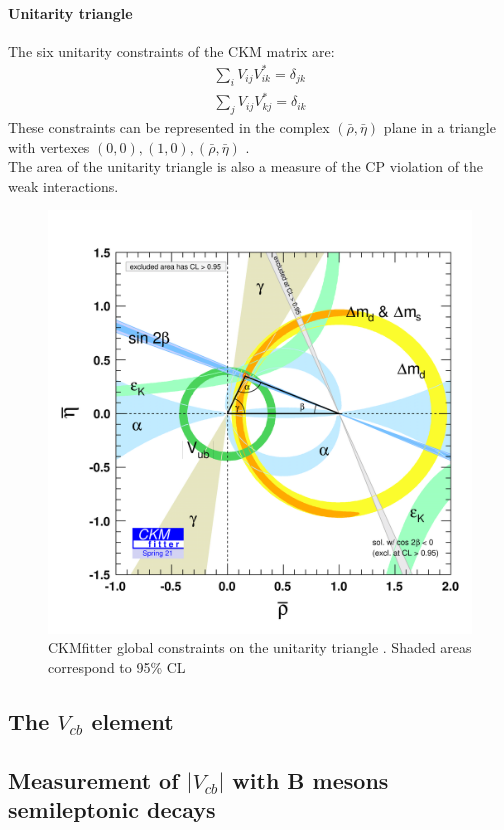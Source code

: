 \paragraph*{Unitarity triangle}
The six unitarity constraints of the CKM matrix are:
\begin{gather}
    \sum_i V_{ij}V_{ik}^*=\delta_{jk}\\
    \sum_j V_{ij}V_{kj}^*=\delta_{ik}
\end{gather}
These constraints can be represented in the complex $(\bar{\rho},\bar{\eta})$ plane in a triangle with vertexes $(0,0), (1,0), (\bar{\rho},\bar{\eta})$ .\\
The area of the unitarity triangle is also a measure of the CP violation of the weak interactions.
\begin{figure}[h]
    \centering
    \includegraphics[width=0.85\linewidth]{fig//chap02-theory/triangle.png}
    \caption{CKMfitter global constraints on the unitarity triangle \cite{CKMfitter}. Shaded areas correspond to 95\% CL}
    \label{fig:triangle}
\end{figure}

\subsection{The $V_{cb}$ element}

\subsection{Measurement of $|V_{cb}|$ with B mesons semileptonic decays}

